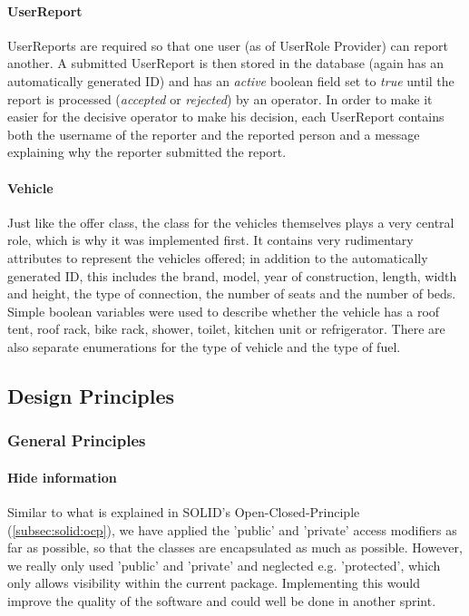 \paragraph{UserReport}
UserReports are required so that one user (as of UserRole Provider) can report another. A submitted UserReport is then stored in the database (again has an automatically generated ID) and has an \textit{active} boolean field set to \textit{true} until the report is processed (\textit{accepted} or \textit{rejected}) by an operator. In order to make it easier for the decisive operator to make his decision, each UserReport contains both the username of the reporter and the reported person and a message explaining why the reporter submitted the report.

\paragraph{Vehicle}
Just like the offer class, the class for the vehicles themselves plays a very central role, which is why it was implemented first. It contains very rudimentary attributes to represent the vehicles offered; in addition to the automatically generated ID, this includes the brand, model, year of construction, length, width and height, the type of connection, the number of seats and the number of beds. Simple boolean variables were used to describe whether the vehicle has a roof tent, roof rack, bike rack, shower, toilet, kitchen unit or refrigerator. There are also separate enumerations for the type of vehicle and the type of fuel.

\subsection{Design Principles}

\subsubsection{General Principles}

\paragraph{Hide information}
Similar to what is explained in SOLID's Open-Closed-Principle (\ref{subsec:solid:ocp}), we have applied the 'public' and 'private' access modifiers as far as possible, so that the classes are encapsulated as much as possible. However, we really only used 'public' and 'private' and neglected e.g. 'protected', which only allows visibility within the current package. Implementing this would improve the quality of the software and could well be done in another sprint.

